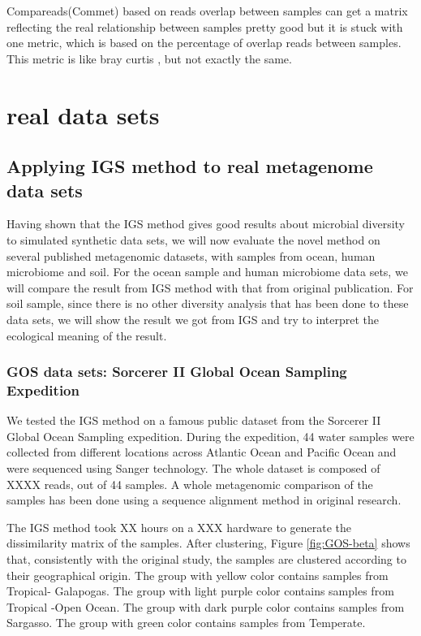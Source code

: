 \documentclass[12pt]{report}
\begin{document}
Compareads(Commet) based on reads overlap between samples can get a matrix reflecting the real relationship between samples pretty good but it is stuck with one metric, which is based on the percentage of overlap reads between samples. This metric is like bray curtis , but not exactly the same.

\chapter{real data sets}

\section{Applying IGS method to real metagenome data sets}

Having shown that the IGS method gives good results about microbial diversity to simulated synthetic data sets, 
we will now evaluate the novel method on several published metagenomic datasets, with samples 
from ocean, human microbiome and soil. For the ocean sample and human microbiome data sets, we will compare the result from IGS method
with that from original publication. For soil sample, since there is no other diversity analysis that has been done
to these data sets, we will show the result we got from IGS and try to interpret the ecological meaning of the result.


\subsection{GOS data sets: Sorcerer II Global Ocean Sampling Expedition}

We tested the IGS method on a famous public dataset from the Sorcerer II Global Ocean Sampling expedition.
During the expedition, 44 water samples were collected from different locations across
Atlantic Ocean and Pacific Ocean and were sequenced using Sanger technology. The whole dataset is composed of XXXX reads, out of 44 samples.
A whole metagenomic comparison of the samples has been done
using a sequence alignment method in original research. 

The IGS method took XX hours on a XXX hardware to generate the dissimilarity matrix of the samples. After clustering, 
Figure \ref{fig:GOS-beta} shows that, consistently with the original study, the samples are clustered according to their 
geographical origin. The group with yellow color contains samples from Tropical- Galapogas. The group with light purple color
contains samples from Tropical -Open Ocean. The group with dark purple color contains samples from Sargasso. The group 
with green color contains samples from Temperate. 
\end{document}
